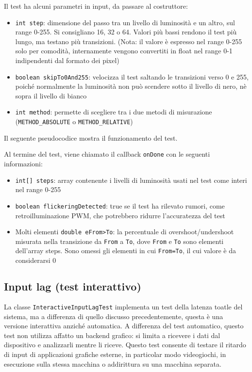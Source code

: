 Il test ha alcuni parametri in input, da passare al costruttore:\begin{itemize}
	\item \texttt{int step}: dimensione del passo tra un livello di luminosità e un altro, sul range 0-255. Si consigliano 16, 32 o 64. Valori più bassi rendono il test più lungo, ma testano più transizioni. (Nota: il valore è espresso nel range 0-255 solo per comodità, internamente vengono convertiti in float nel range 0-1 indipendenti dal formato dei pixel)
	\item \texttt{boolean skipTo0And255}: velocizza il test saltando le transizioni verso 0 e 255, poiché normalmente la luminosità non può scendere sotto il livello di nero, nè sopra il livello di bianco
	\item \texttt{int method}: permette di scegliere tra i due metodi di misurazione (\texttt{METHOD\_ABSOLUTE} o \texttt{METHOD\_RELATIVE})
\end{itemize}

Il seguente pseudocodice mostra il funzionamento del test.


Al termine del test, viene chiamato il callback \texttt{onDone} con le seguenti informazioni:\begin{itemize}
	\item \texttt{int[] steps}: array contenente i livelli di luminosità usati nel test come interi nel range 0-255
	\item \texttt{boolean flickeringDetected}: true se il test ha rilevato rumori, come retroilluminazione PWM, che potrebbero ridurre l'accuratezza del test
	\item Molti elementi \texttt{double eFrom>To}: la percentuale di overshoot/undershoot misurata nella transizione da \texttt{From} a \texttt{To}, dove \texttt{From} e \texttt{To} sono elementi dell'array steps. Sono omessi gli elementi in cui \texttt{From=To}, il cui valore è da considerarsi 0
\end{itemize}

\subsection{Input lag (test interattivo)}
La classe \texttt{InteractiveInputLagTest} implementa un test della latenza toatle del sistema, ma a differenza di quello discusso precedentemente, questa è una versione interattiva anziché automatica. A differenza del test automatico, questo test non utilizza affatto un backend grafico: si limita a ricevere i dati dal dispositivo e analizzarli mentre li riceve. Questo test consente di testare il ritardo di input di applicazioni grafiche esterne, in particolar modo videogiochi, in esecuzione sulla stessa macchina o addirittura su una macchina separata.

